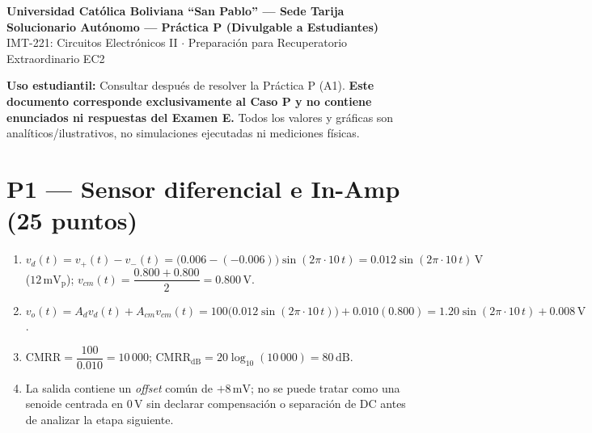 \documentclass[10pt, a4paper]{article}
\begin{document}
\begin{center}
    {\large\textbf{\textcolor{ucbblue}{Universidad Católica Boliviana ``San Pablo'' --- Sede Tarija}}}\\[0.08cm]
    {\Large\textbf{Solucionario Autónomo --- Práctica P (Divulgable a Estudiantes)}}\\
    {\normalsize IMT-221: Circuitos Electrónicos II $\cdot$ Preparación para Recuperatorio Extraordinario EC2}
\end{center}

\begin{tcolorbox}[colback=greenbg, colframe=siggreen, boxrule=0.7pt, arc=1.5mm, left=6pt, right=6pt, top=4pt, bottom=4pt]
    \footnotesize
    \textbf{Uso estudiantil:} Consultar después de resolver la Práctica P (A1). \textbf{Este documento corresponde exclusivamente al Caso P y no contiene enunciados ni respuestas del Examen E.} Todos los valores y gráficas son analíticos/ilustrativos, no simulaciones ejecutadas ni mediciones físicas.
\end{tcolorbox}

\section*{P1 --- Sensor diferencial e In-Amp (25 puntos)}

\begin{enumerate}
    \setlength{\itemsep}{2pt}
    \item $v_d(t) = v_+(t) - v_-(t) = \bigl(0.006 - (-0.006)\bigr)\sin(2\pi\cdot 10\,t) = 0.012\sin(2\pi\cdot 10\,t)\,\mathrm{V}$ ($12\,\mathrm{mV_p}$); \quad $v_{cm}(t) = \dfrac{0.800 + 0.800}{2} = 0.800\,\mathrm{V}$.
    \item $v_o(t) = A_d v_d(t) + A_{cm} v_{cm}(t) = 100\bigl(0.012\sin(2\pi\cdot 10\,t)\bigr) + 0.010(0.800) = 1.20\sin(2\pi\cdot 10\,t) + 0.008\,\mathrm{V}$.
    \item $\mathrm{CMRR} = \dfrac{100}{0.010} = 10\,000$; \qquad $\mathrm{CMRR}_{\mathrm{dB}} = 20\log_{10}(10\,000) = 80\,\mathrm{dB}$.
    \item La salida contiene un \textit{offset} común de $+8\,\mathrm{mV}$; no se puede tratar como una senoide centrada en $0\,\mathrm{V}$ sin declarar compensación o separación de DC antes de analizar la etapa siguiente.
\end{enumerate}
\end{document}
